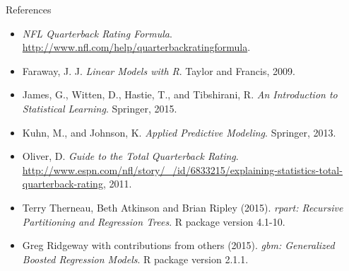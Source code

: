 \documentclass{beamer}
\begin{document}
	\begin{frame}{References}
	\small
		\begin{itemize}
			\item \textit{NFL Quarterback Rating Formula}. \url{http://www.nfl.com/help/quarterbackratingformula}.
			\item Faraway, J. J. \textit{Linear Models with R}. Taylor and Francis, 2009.
			\item James, G., Witten, D., Hastie, T., and Tibshirani, R. \textit{An Introduction to Statistical Learning}. Springer, 2015.
			\item Kuhn, M., and Johnson, K. \textit{Applied Predictive Modeling}. Springer, 2013.
			\item Oliver, D. \textit{Guide to the Total Quarterback Rating}.\\
			\url{http://www.espn.com/nfl/story/_/id/6833215/explaining-statistics-total-quarterback-rating}, 2011.
			\item Terry Therneau, Beth Atkinson and Brian Ripley (2015). \textit{rpart:
			Recursive Partitioning and Regression Trees}. R package version
			4.1-10.
			\item Greg Ridgeway with contributions from others (2015). \textit{gbm: Generalized
			Boosted Regression Models}. R package version 2.1.1.
		\end{itemize}
	\end{frame}
	
\end{document}
